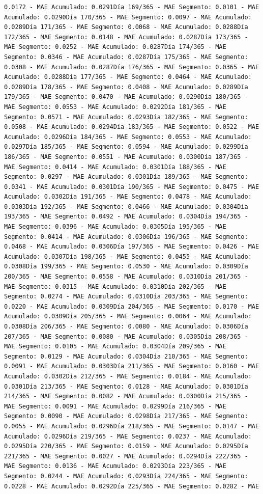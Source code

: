 \documentclass[
]{book}
\begin{document}
\begin{verbatim}
0.0172 - MAE Acumulado: 0.0291Día 169/365 - MAE Segmento: 0.0101 - MAE Acumulado: 0.0290Día 170/365 - MAE Segmento: 0.0097 - MAE Acumulado: 0.0289Día 171/365 - MAE Segmento: 0.0068 - MAE Acumulado: 0.0288Día 172/365 - MAE Segmento: 0.0148 - MAE Acumulado: 0.0287Día 173/365 - MAE Segmento: 0.0252 - MAE Acumulado: 0.0287Día 174/365 - MAE Segmento: 0.0346 - MAE Acumulado: 0.0287Día 175/365 - MAE Segmento: 0.0308 - MAE Acumulado: 0.0287Día 176/365 - MAE Segmento: 0.0365 - MAE Acumulado: 0.0288Día 177/365 - MAE Segmento: 0.0464 - MAE Acumulado: 0.0289Día 178/365 - MAE Segmento: 0.0408 - MAE Acumulado: 0.0289Día 179/365 - MAE Segmento: 0.0470 - MAE Acumulado: 0.0290Día 180/365 - MAE Segmento: 0.0553 - MAE Acumulado: 0.0292Día 181/365 - MAE Segmento: 0.0571 - MAE Acumulado: 0.0293Día 182/365 - MAE Segmento: 0.0508 - MAE Acumulado: 0.0294Día 183/365 - MAE Segmento: 0.0522 - MAE Acumulado: 0.0296Día 184/365 - MAE Segmento: 0.0553 - MAE Acumulado: 0.0297Día 185/365 - MAE Segmento: 0.0594 - MAE Acumulado: 0.0299Día 186/365 - MAE Segmento: 0.0551 - MAE Acumulado: 0.0300Día 187/365 - MAE Segmento: 0.0414 - MAE Acumulado: 0.0301Día 188/365 - MAE Segmento: 0.0297 - MAE Acumulado: 0.0301Día 189/365 - MAE Segmento: 0.0341 - MAE Acumulado: 0.0301Día 190/365 - MAE Segmento: 0.0475 - MAE Acumulado: 0.0302Día 191/365 - MAE Segmento: 0.0478 - MAE Acumulado: 0.0303Día 192/365 - MAE Segmento: 0.0466 - MAE Acumulado: 0.0304Día 193/365 - MAE Segmento: 0.0492 - MAE Acumulado: 0.0304Día 194/365 - MAE Segmento: 0.0396 - MAE Acumulado: 0.0305Día 195/365 - MAE Segmento: 0.0414 - MAE Acumulado: 0.0306Día 196/365 - MAE Segmento: 0.0468 - MAE Acumulado: 0.0306Día 197/365 - MAE Segmento: 0.0426 - MAE Acumulado: 0.0307Día 198/365 - MAE Segmento: 0.0455 - MAE Acumulado: 0.0308Día 199/365 - MAE Segmento: 0.0530 - MAE Acumulado: 0.0309Día 200/365 - MAE Segmento: 0.0558 - MAE Acumulado: 0.0310Día 201/365 - MAE Segmento: 0.0315 - MAE Acumulado: 0.0310Día 202/365 - MAE Segmento: 0.0274 - MAE Acumulado: 0.0310Día 203/365 - MAE Segmento: 0.0220 - MAE Acumulado: 0.0309Día 204/365 - MAE Segmento: 0.0170 - MAE Acumulado: 0.0309Día 205/365 - MAE Segmento: 0.0064 - MAE Acumulado: 0.0308Día 206/365 - MAE Segmento: 0.0080 - MAE Acumulado: 0.0306Día 207/365 - MAE Segmento: 0.0080 - MAE Acumulado: 0.0305Día 208/365 - MAE Segmento: 0.0105 - MAE Acumulado: 0.0304Día 209/365 - MAE Segmento: 0.0129 - MAE Acumulado: 0.0304Día 210/365 - MAE Segmento: 0.0091 - MAE Acumulado: 0.0303Día 211/365 - MAE Segmento: 0.0160 - MAE Acumulado: 0.0302Día 212/365 - MAE Segmento: 0.0184 - MAE Acumulado: 0.0301Día 213/365 - MAE Segmento: 0.0128 - MAE Acumulado: 0.0301Día 214/365 - MAE Segmento: 0.0082 - MAE Acumulado: 0.0300Día 215/365 - MAE Segmento: 0.0091 - MAE Acumulado: 0.0299Día 216/365 - MAE Segmento: 0.0090 - MAE Acumulado: 0.0298Día 217/365 - MAE Segmento: 0.0055 - MAE Acumulado: 0.0296Día 218/365 - MAE Segmento: 0.0147 - MAE Acumulado: 0.0296Día 219/365 - MAE Segmento: 0.0237 - MAE Acumulado: 0.0295Día 220/365 - MAE Segmento: 0.0159 - MAE Acumulado: 0.0295Día 221/365 - MAE Segmento: 0.0027 - MAE Acumulado: 0.0294Día 222/365 - MAE Segmento: 0.0136 - MAE Acumulado: 0.0293Día 223/365 - MAE Segmento: 0.0244 - MAE Acumulado: 0.0293Día 224/365 - MAE Segmento: 0.0228 - MAE Acumulado: 0.0292Día 225/365 - MAE Segmento: 0.0282 - MAE 
\end{verbatim}
\end{document}
